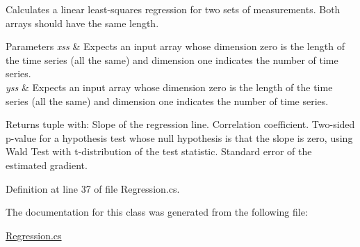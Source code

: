 Calculates a linear least-\/squares regression for two sets of measurements. Both arrays should have the same length. 


\begin{DoxyParams}{Parameters}
{\em xss} & Expects an input array whose dimension zero is the length of the time series (all the same) and dimension one indicates the number of time series.\\
\hline
{\em yss} & Expects an input array whose dimension zero is the length of the time series (all the same) and dimension one indicates the number of time series.\\
\hline
\end{DoxyParams}
\begin{DoxyReturn}{Returns}
tuple with\+: Slope of the regression line. Correlation coefficient. Two-\/sided p-\/value for a hypothesis test whose null hypothesis is that the slope is zero, using Wald Test with t-\/distribution of the test statistic. Standard error of the estimated gradient.
\end{DoxyReturn}


Definition at line 37 of file Regression.\+cs.



The documentation for this class was generated from the following file\+:\begin{DoxyCompactItemize}
\item 
\mbox{\hyperlink{_regression_8cs}{Regression.\+cs}}\end{DoxyCompactItemize}
